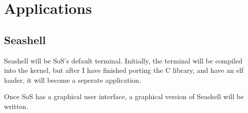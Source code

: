 \section{Applications}
\subsection{Seashell}
Seashell will be SoS's default terminal. Initially, the terminal will be compiled into the kernel, but after
I have finished porting the C library, and have an elf loader, it will become a seperate application.

Once SoS has a graphical user interface, a graphical version of Seashell will be written.
